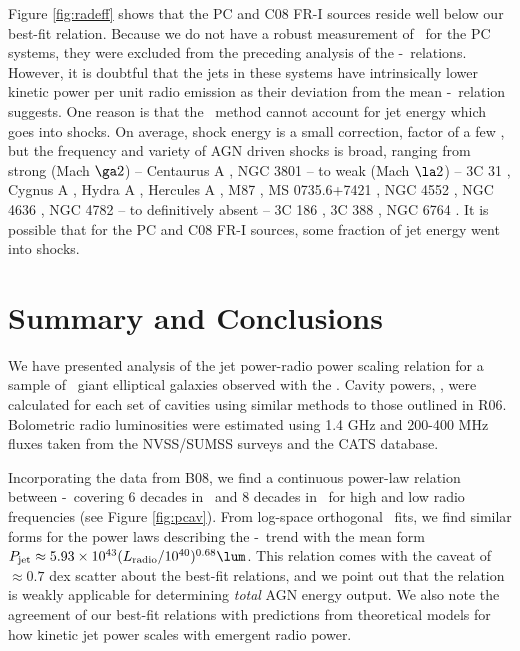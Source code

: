 \documentclass{emulateapj}
\begin{document}
Figure \ref{fig:radeff} shows that the PC and C08 FR-I sources reside
well below our best-fit relation. Because we do not have a robust
measurement of \pcav\ for the PC systems, they were excluded from the
preceding analysis of the \pjet-\prad\ relations. However, it is
doubtful that the jets in these systems have intrinsically lower
kinetic power per unit radio emission as their deviation from the mean
\pjet-\prad\ relation suggests. One reason is that the \pcav\ method
cannot account for jet energy which goes into shocks. On average,
shock energy is a small correction, factor of a few \citep{mcnamrev},
but the frequency and variety of AGN driven shocks is broad, ranging
from strong (Mach $\ga 2$) -- Centaurus A \citep{2003ApJ...592..129K,
  2009MNRAS.395.1999C}, NGC 3801 \citep{2007ApJ...660..191C} -- to
weak (Mach $\la 2$) -- 3C 31 \citep{2002MNRAS.336.1161L}, Cygnus A
\citep{2006ApJ...644L...9W}, Hydra A \citep{hydraa}, Hercules A
\citep{herca}, M87 \citep{2007ApJ...665.1057F}, MS 0735.6+7421
\citep{ms0735}, NGC 4552 \citep{2006ApJ...648..947M}, NGC 4636
\citep{2009arXiv0909.2942B}, NGC 4782 \citep[][shock attributed to
  merger, but also coincident with radio outflow]{2007ApJ...664..804M}
-- to definitively absent -- 3C 186 \citep{2008ApJ...684..811S}, 3C
388 \citep{2006ApJ...639..753K}, NGC 6764
\citep{2008ApJ...688..190C}. It is possible that for the PC and C08
FR-I sources, some fraction of jet energy went into shocks.

\section{Summary and Conclusions}
\label{sec:summary}

We have presented analysis of the jet power-radio power scaling
relation for a sample of \samp\ giant elliptical galaxies observed
with the \cxo. Cavity powers, \pjet, were calculated for each set of
cavities using similar methods to those outlined in R06. Bolometric
radio luminosities were estimated using 1.4 GHz and 200-400 MHz fluxes
taken from the NVSS/SUMSS surveys and the CATS database.

Incorporating the data from B08, we find a continuous power-law
relation between \pjet-\prad\ covering 6 decades in \prad\ and 8
decades in \pjet\ for high and low radio frequencies (see Figure
\ref{fig:pcav}). From log-space orthogonal \bces\ fits, we find
similar forms for the power laws describing the \pjet-\prad\ trend
with the mean form $\pjet \approx 5.93\times10^{43}
(\prad/10^{40})^{0.68} \lum$. This relation comes with the caveat of
$\approx 0.7$ dex scatter about the best-fit relations, and we point
out that the relation is weakly applicable for determining
{\it{total}} AGN energy output. We also note the agreement of our
best-fit relations with predictions from theoretical models for how
kinetic jet power scales with emergent radio power.
\end{document}
